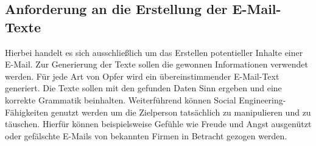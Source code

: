 	\subsection{Anforderung an die Erstellung der E-Mail-Texte}
	Hierbei handelt es sich ausschließlich um das Erstellen potentieller Inhalte einer E-Mail. Zur Generierung der Texte sollen die gewonnen Informationen verwendet werden. Für jede Art von Opfer wird ein übereinstimmender E-Mail-Text generiert. Die Texte sollen mit den gefunden Daten Sinn ergeben und eine korrekte Grammatik beinhalten. Weiterführend können Social Engineering-Fähigkeiten genutzt werden um die Zielperson tatsächlich zu manipulieren und zu täuschen. Hierfür können beispielsweise Gefühle wie Freude und Angst ausgenützt oder gefälschte E-Mails von bekannten Firmen in Betracht gezogen werden.

